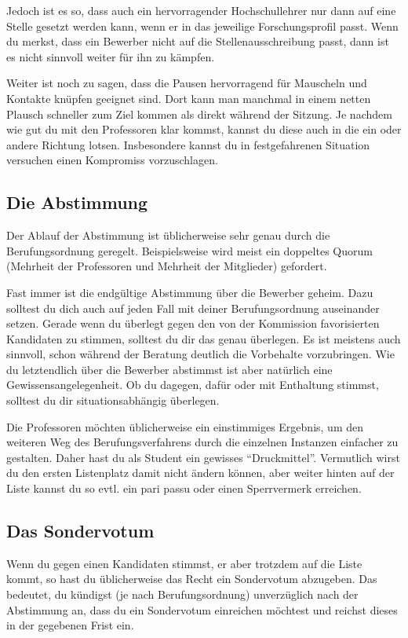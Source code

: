 Jedoch ist es so, dass auch ein hervorragender Hochschullehrer nur dann auf eine Stelle gesetzt werden kann, wenn er in das jeweilige Forschungsprofil passt. Wenn du merkst, dass ein Bewerber nicht auf die Stellenausschreibung passt, dann ist es nicht sinnvoll weiter für ihn zu kämpfen.

Weiter ist noch zu sagen, dass die Pausen hervorragend für Mauscheln und Kontakte knüpfen geeignet sind. Dort kann man manchmal in einem netten Plausch schneller zum Ziel kommen als direkt während der Sitzung. Je nachdem wie gut du mit den Professoren klar kommst, kannst du diese auch in die ein oder andere Richtung lotsen. Insbesondere kannst du in festgefahrenen Situation versuchen einen Kompromiss vorzuschlagen.

\subsection{Die Abstimmung}
Der Ablauf der Abstimmung ist üblicherweise sehr genau durch die Berufungsordnung geregelt. Beispielsweise wird meist ein doppeltes Quorum (Mehrheit der Professoren und Mehrheit der Mitglieder) gefordert.

Fast immer ist die endgültige Abstimmung über die Bewerber geheim. Dazu solltest du dich auch auf jeden Fall mit deiner Berufungsordnung auseinander setzen. Gerade wenn du überlegt gegen den von der Kommission favorisierten Kandidaten zu stimmen, solltest du dir das genau überlegen. Es ist meistens auch sinnvoll, schon während der Beratung deutlich die Vorbehalte vorzubringen. Wie du letztendlich über die Bewerber abstimmst ist aber natürlich eine Gewissensangelegenheit. Ob du dagegen, dafür oder mit Enthaltung stimmst, solltest du dir situationsabhängig überlegen.

Die Professoren möchten üblicherweise ein einstimmiges Ergebnis, um den weiteren Weg des Berufungsverfahrens durch die einzelnen Instanzen einfacher zu gestalten. Daher hast du als Student ein gewisses "`Druckmittel"'. Vermutlich wirst du den ersten Listenplatz damit nicht ändern können, aber weiter hinten auf der Liste kannst du so evtl. ein pari passu oder einen Sperrvermerk erreichen.


\subsection{Das Sondervotum}
Wenn du gegen einen Kandidaten stimmst, er aber trotzdem auf die Liste kommt, so hast du üblicherweise das Recht ein Sondervotum abzugeben. Das bedeutet, du kündigst (je nach Berufungsordnung) unverzüglich nach der Abstimmung an, dass du ein Sondervotum einreichen möchtest und reichst dieses in der gegebenen Frist ein.

